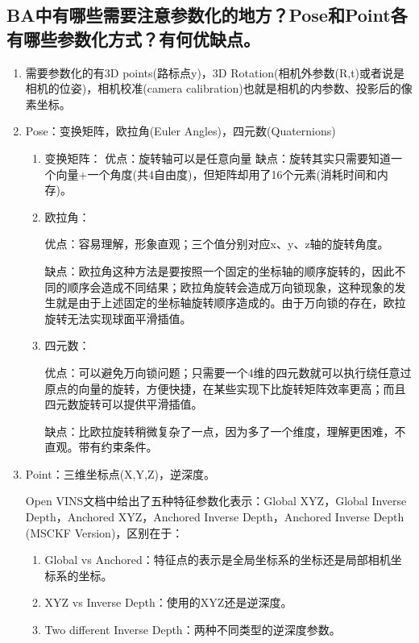 \documentclass[40pt,a4paper，UTF8]{ctexart}
\numberwithin{equation}{section}
\begin{document}
\subsection{BA中有哪些需要注意参数化的地⽅？Pose和Point各有哪些参数化⽅式？有何优缺点。}
\begin{enumerate}
\item 需要参数化的有3D points(路标点y)，3D Rotation(相机外参数(R,t)或者说是相机的位姿)，相机校准(camera calibration)也就是相机的内参数、投影后的像素坐标。
\item Pose：变换矩阵，欧拉角(Euler Angles)，四元数(Quaternions)
\begin{enumerate}
\item 变换矩阵：
优点：旋转轴可以是任意向量
缺点：旋转其实只需要知道一个向量+一个角度(共4自由度)，但矩阵却用了16个元素(消耗时间和内存)。

\item 欧拉角：

优点：容易理解，形象直观；三个值分别对应x、y、z轴的旋转角度。

缺点：欧拉角这种方法是要按照一个固定的坐标轴的顺序旋转的，因此不同的顺序会造成不同结果；欧拉角旋转会造成万向锁现象，这种现象的发生就是由于上述固定的坐标轴旋转顺序造成的。由于万向锁的存在，欧拉旋转无法实现球面平滑插值。

\item 四元数：

优点：可以避免万向锁问题；只需要一个4维的四元数就可以执行绕任意过原点的向量的旋转，方便快捷，在某些实现下比旋转矩阵效率更高；而且四元数旋转可以提供平滑插值。

缺点：比欧拉旋转稍微复杂了一点，因为多了一个维度，理解更困难，不直观。带有约束条件。
\end{enumerate}




\item Point：三维坐标点(X,Y,Z)，逆深度。

Open VINS文档中给出了五种特征参数化表示：Global XYZ，Global Inverse Depth，Anchored XYZ，Anchored Inverse Depth，Anchored Inverse Depth (MSCKF Version)，区别在于：
\begin{enumerate}

\item Global vs Anchored：特征点的表示是全局坐标系的坐标还是局部相机坐标系的坐标。

\item XYZ vs Inverse Depth：使用的XYZ还是逆深度。

\item Two different Inverse Depth：两种不同类型的逆深度参数。

\end{enumerate}
\end{enumerate}
\end{document}
